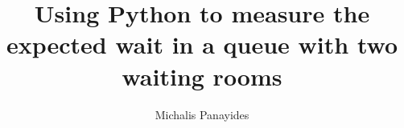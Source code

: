 \documentclass{beamer}
\title{\Large{Using Python to measure the expected wait in a queue with two waiting rooms}}
\author{Michalis Panayides}
\begin{document}
    \frame{\titlepage}

    
\end{document}
